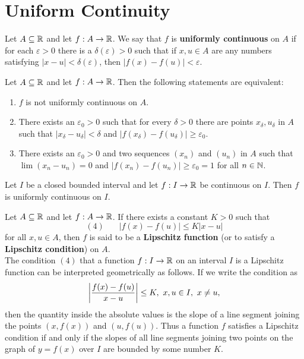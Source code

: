 \section{Uniform Continuity}

\begin{definition}
	Let $A \subseteq \mathbb{R}$ and let $f:A \rightarrow \mathbb{R}$. We say that $f$ is \textbf{uniformly continuous} on $A$ if for each $\varepsilon > 0$ there is a $\delta (\varepsilon) > 0$ such that if $x,u \in A$ are any numbers satisfying $|x-u|<\delta (\varepsilon)$, then $|f(x)-f(u)| < \varepsilon$.
\end{definition}

\begin{theorem}
	Let $A \subseteq \mathbb{R}$ and let $f:A \rightarrow \mathbb{R}$. Then the following statements are equivalent:
	\begin{enumerate}
		\item $f$ is not uniformly continuous on $A$.

		\item There exists an $\varepsilon_0 > 0$ such that for every $\delta > 0$ there are points $x_\delta, u_\delta$ in $A$ such that $|x_\delta - u_\delta|<\delta$ and $|f(x_\delta) - f(u_\delta)| \geq \varepsilon_0$.

		\item There exists an $\varepsilon_0 > 0$ and two sequences $(x_n)$ and $(u_n)$ in $A$ such that $\lim (x_n - u_n)=0$ and $|f(x_n)-f(u_n)|\geq \varepsilon_0=1$ for all $n \in \mathbb{N}$.
	\end{enumerate}
\end{theorem}

\begin{theorem}
	Let $I$ be a closed bounded interval and let $f:I \rightarrow \mathbb{R}$ be continuous on $I$. Then $f$ is uniformly continuous on $I$.
\end{theorem}

\begin{definition}
	Let $A \subseteq \mathbb{R}$ and let $f:A \rightarrow \mathbb{R}$. If there exists a constant $K > 0$ such that
	\[(4)\ \ \ \ \ \ \ \ |f(x)-f(u)| \leq K|x-u|\]
	for all $x,u \in A$, then $f$ is said to be a \textbf{Lipschitz function} (or to satisfy a \textbf{Lipschitz condition}) on $A$.\\

	The condition $(4)$ that a function $f: I \to \mathbb{R}$ on an interval $I$ is a Lipschitz function can be interpreted geometrically as follows. If we write the condition as
	\[\left\lvert \frac{f(x)-f(u)}{x-u} \right\rvert\leq K,\ x,u \in I,\ x \neq u,\]
	then the quantity inside the absolute values is the slope of a line segment joining the points $(x,f(x))$ and $(u,f(u))$. Thus a function $f$ satisfies a Lipschitz condition if and only if the slopes of all line segments joining two points on the graph of $y=f(x)$ over $I$ are bounded by some number $K$.
\end{definition}

